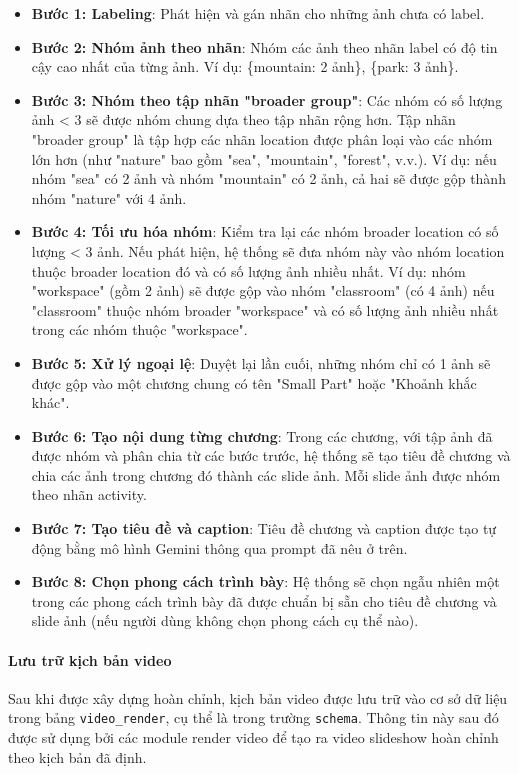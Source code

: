 \begin{itemize}
    \item \textbf{Bước 1: Labeling}: Phát hiện và gán nhãn cho những ảnh chưa có label.
    
    \item \textbf{Bước 2: Nhóm ảnh theo nhãn}: Nhóm các ảnh theo nhãn label có độ tin cậy cao nhất của từng ảnh. Ví dụ: \{mountain: 2 ảnh\}, \{park: 3 ảnh\}.
    
    \item \textbf{Bước 3: Nhóm theo tập nhãn "broader group"}: Các nhóm có số lượng ảnh < 3 sẽ được nhóm chung dựa theo tập nhãn rộng hơn. Tập nhãn "broader group" là tập hợp các nhãn location được phân loại vào các nhóm lớn hơn (như "nature" bao gồm "sea", "mountain", "forest", v.v.). Ví dụ: nếu nhóm "sea" có 2 ảnh và nhóm "mountain" có 2 ảnh, cả hai sẽ được gộp thành nhóm "nature" với 4 ảnh.
    
    \item \textbf{Bước 4: Tối ưu hóa nhóm}: Kiểm tra lại các nhóm broader location có số lượng < 3 ảnh. Nếu phát hiện, hệ thống sẽ đưa nhóm này vào nhóm location thuộc broader location đó và có số lượng ảnh nhiều nhất. Ví dụ: nhóm "workspace" (gồm 2 ảnh) sẽ được gộp vào nhóm "classroom" (có 4 ảnh) nếu "classroom" thuộc nhóm broader "workspace" và có số lượng ảnh nhiều nhất trong các nhóm thuộc "workspace".
    
    \item \textbf{Bước 5: Xử lý ngoại lệ}: Duyệt lại lần cuối, những nhóm chỉ có 1 ảnh sẽ được gộp vào một chương chung có tên "Small Part" hoặc "Khoảnh khắc khác".
    \item \textbf{Bước 6: Tạo nội dung từng chương}: Trong các chương, với tập ảnh đã được nhóm và phân chia từ các bước trước, hệ thống sẽ tạo tiêu đề chương và chia các ảnh trong chương đó thành các slide ảnh. Mỗi slide ảnh được nhóm theo nhãn activity. 
    \item \textbf{Bước 7: Tạo tiêu đề và caption}: Tiêu đề chương và caption được tạo tự động bằng mô hình Gemini thông qua prompt đã nêu ở trên. 
    \item \textbf{Bước 8: Chọn phong cách trình bày}: Hệ thống sẽ chọn ngẫu nhiên một trong các phong cách trình bày đã được chuẩn bị sẵn cho tiêu đề chương và slide ảnh (nếu người dùng không chọn phong cách cụ thể nào).
\end{itemize}

\paragraph{Lưu trữ kịch bản video}
Sau khi được xây dựng hoàn chỉnh, kịch bản video được lưu trữ vào cơ sở dữ liệu trong bảng \texttt{video\_render}, cụ thể là trong trường \texttt{schema}. Thông tin này sau đó được sử dụng bởi các module render video để tạo ra video slideshow hoàn chỉnh theo kịch bản đã định.

